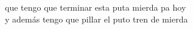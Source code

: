 \documentclass[preview]{standalone}
\begin{document}
\begin{center}
que tengo que terminar esta puta mierda pa hoy \\y además tengo que pillar el puto tren de mierda
\end{center}
\end{document}
